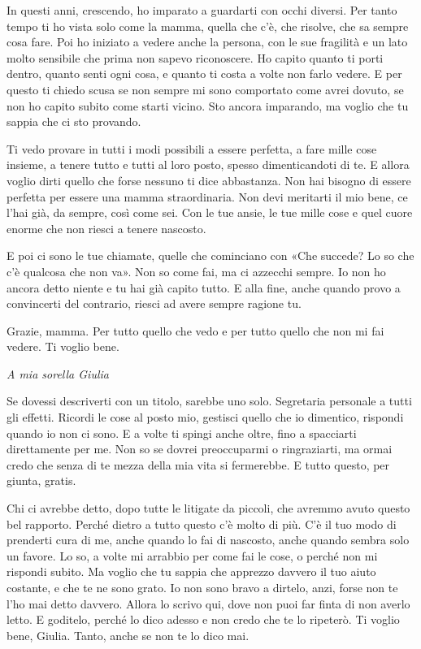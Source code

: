 In questi anni, crescendo, ho imparato a guardarti con occhi diversi. Per tanto tempo ti ho vista solo come la mamma, quella che c'è, che risolve, che sa sempre cosa fare. Poi ho iniziato a vedere anche la persona, con le sue fragilità e un lato molto sensibile che prima non sapevo riconoscere. Ho capito quanto ti porti dentro, quanto senti ogni cosa, e quanto ti costa a volte non farlo vedere. E per questo ti chiedo scusa se non sempre mi sono comportato come avrei dovuto, se non ho capito subito come starti vicino. Sto ancora imparando, ma voglio che tu sappia che ci sto provando.\par

Ti vedo provare in tutti i modi possibili a essere perfetta, a fare mille cose insieme, a tenere tutto e tutti al loro posto, spesso dimenticandoti di te. E allora voglio dirti quello che forse nessuno ti dice abbastanza. Non hai bisogno di essere perfetta per essere una mamma straordinaria. Non devi meritarti il mio bene, ce l'hai già, da sempre, così come sei. Con le tue ansie, le tue mille cose e quel cuore enorme che non riesci a tenere nascosto.\par

E poi ci sono le tue chiamate, quelle che cominciano con «Che succede? Lo so che c'è qualcosa che non va». Non so come fai, ma ci azzecchi sempre. Io non ho ancora detto niente e tu hai già capito tutto. E alla fine, anche quando provo a convincerti del contrario, riesci ad avere sempre ragione tu.\par

Grazie, mamma. Per tutto quello che vedo e per tutto quello che non mi fai vedere. Ti voglio bene.\par

\vspace{5mm}
\textit{A mia sorella Giulia}\par
\vspace{2mm}
Se dovessi descriverti con un titolo, sarebbe uno solo. Segretaria personale a tutti gli effetti. Ricordi le cose al posto mio, gestisci quello che io dimentico, rispondi quando io non ci sono. E a volte ti spingi anche oltre, fino a spacciarti direttamente per me. Non so se dovrei preoccuparmi o ringraziarti, ma ormai credo che senza di te mezza della mia vita si fermerebbe. E tutto questo, per giunta, gratis.\par

Chi ci avrebbe detto, dopo tutte le litigate da piccoli, che avremmo avuto questo bel rapporto. Perché dietro a tutto questo c'è molto di più. C'è il tuo modo di prenderti cura di me, anche quando lo fai di nascosto, anche quando sembra solo un favore. Lo so, a volte mi arrabbio per come fai le cose, o perché non mi rispondi subito. Ma voglio che tu sappia che apprezzo davvero il tuo aiuto costante, e che te ne sono grato. Io non sono bravo a dirtelo, anzi, forse non te l'ho mai detto davvero. Allora lo scrivo qui, dove non puoi far finta di non averlo letto. E goditelo, perché lo dico adesso e non credo che te lo ripeterò. Ti voglio bene, Giulia. Tanto, anche se non te lo dico mai.\par

